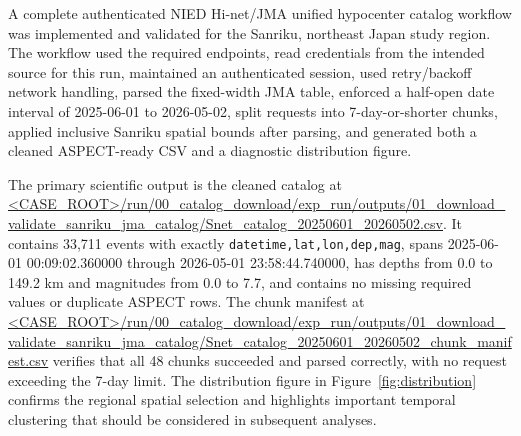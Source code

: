 \documentclass[11pt]{article}
\newcommand{\catalogcsvurl}{\url{<CASE_ROOT>/run/00_catalog_download/exp_run/outputs/01_download_validate_sanriku_jma_catalog/Snet_catalog_20250601_20260502.csv}}
\newcommand{\manifestcsvurl}{\url{<CASE_ROOT>/run/00_catalog_download/exp_run/outputs/01_download_validate_sanriku_jma_catalog/Snet_catalog_20250601_20260502_chunk_manifest.csv}}
\begin{document}
A complete authenticated NIED Hi-net/JMA unified hypocenter catalog workflow was implemented and validated for the Sanriku, northeast Japan study region. The workflow used the required endpoints, read credentials from the intended source for this run, maintained an authenticated session, used retry/backoff network handling, parsed the fixed-width JMA table, enforced a half-open date interval of 2025-06-01 to 2026-05-02, split requests into 7-day-or-shorter chunks, applied inclusive Sanriku spatial bounds after parsing, and generated both a cleaned ASPECT-ready CSV and a diagnostic distribution figure.

The primary scientific output is the cleaned catalog at \catalogcsvurl. It contains 33,711 events with exactly \texttt{datetime,lat,lon,dep,mag}, spans 2025-06-01 00:09:02.360000 through 2026-05-01 23:58:44.740000, has depths from 0.0 to 149.2 km and magnitudes from 0.0 to 7.7, and contains no missing required values or duplicate ASPECT rows. The chunk manifest at \manifestcsvurl{} verifies that all 48 chunks succeeded and parsed correctly, with no request exceeding the 7-day limit. The distribution figure in Figure~\ref{fig:distribution} confirms the regional spatial selection and highlights important temporal clustering that should be considered in subsequent analyses.
\end{document}

